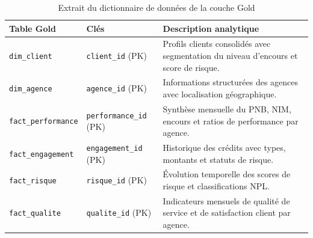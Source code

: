 \documentclass[a4paper,12pt]{report}
\begin{document}
\begin{doublespace}
\begin{table}[H]
\centering
\begin{tabular}{|p{3.5cm}|p{4.5cm}|p{6cm}|}
    \hline
    \textbf{Table Gold} & \textbf{Clés} & \textbf{Description analytique} \\
    \hline
    \texttt{dim\_client} & \texttt{client\_id} (PK) & Profils clients consolidés avec segmentation du niveau d'encours et score de risque. \\
    \hline
    \texttt{dim\_agence} & \texttt{agence\_id} (PK) & Informations structurées des agences avec localisation géographique. \\
    \hline
    \texttt{fact\_performance} & \texttt{performance\_id} (PK) & Synthèse mensuelle du PNB, NIM, encours et ratios de performance par agence. \\
    \hline
    \texttt{fact\_engagement} & \texttt{engagement\_id} (PK) & Historique des crédits avec types, montants et statuts de risque. \\
    \hline
    \texttt{fact\_risque} & \texttt{risque\_id} (PK) & Évolution temporelle des scores de risque et classifications NPL. \\
    \hline
    \texttt{fact\_qualite} & \texttt{qualite\_id} (PK) & Indicateurs mensuels de qualité de service et de satisfaction client par agence. \\
    \hline
\end{tabular}
\caption{Extrait du dictionnaire de données de la couche Gold}
\label{tab:data_dict}
\end{table}
\end{doublespace}
\end{document}

